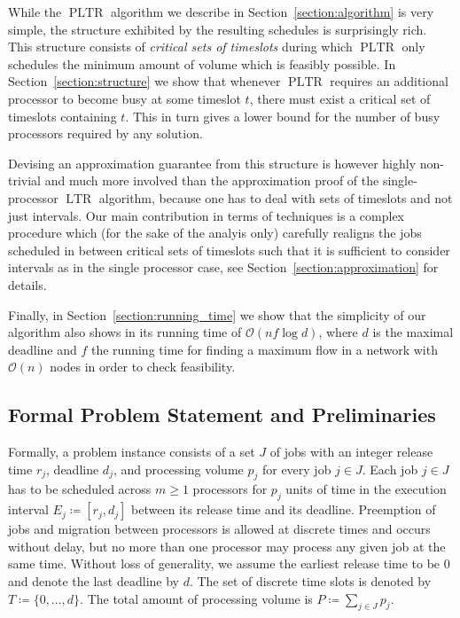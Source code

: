 \documentclass[a4paper]{article}
\DeclareMathOperator{\PLTR}{PLTR}
\DeclareMathOperator{\LTR}{LTR}
\begin{document}
While the $\PLTR$ algorithm we describe in Section~\ref{section:algorithm} is very simple, the structure exhibited by the resulting schedules is surprisingly rich.
This structure consists of \textit{critical sets of timeslots} during which $\PLTR$ only schedules the minimum amount of volume which is feasibly possible.
In Section~\ref{section:structure} we show that whenever $\PLTR$ requires an additional processor to become busy at some timeslot $t$, there must exist a critical set of timeslots containing $t$.
This in turn gives a lower bound for the number of busy processors required by any solution.

Devising an approximation guarantee from this structure is however highly non-trivial and much more involved than the approximation proof of the single-processor $\LTR$ algorithm, because one has to deal with sets of timeslots and not just intervals.
Our main contribution in terms of techniques is a complex procedure which (for the sake of the analyis only) carefully realigns the jobs scheduled in between critical sets of timeslots such that it is sufficient to consider intervals as in the single processor case, see Section~\ref{section:approximation} for details.

Finally, in Section~\ref{section:running_time} we show that the simplicity of our algorithm also shows in its running time of $\mathcal{O}(n f \log d)$, where $d$ is the maximal deadline and $f$ the running time for finding a maximum flow in a network with $\mathcal{O}(n)$ nodes in order to check feasibility.



\subsection{Formal Problem Statement and Preliminaries}
Formally, a problem instance consists of a set $J$ of jobs with an integer release time $r_j$, deadline $d_j$, and processing volume $p_j$ for every job $j \in J$.
Each job $j \in J$ has to be scheduled across $m \geq 1$ processors for $p_j$ units of time in the execution interval $E_j \coloneqq [r_j, d_j]$ between its release time and its deadline.
Preemption of jobs and migration between processors is allowed at discrete times and occurs without delay, but no more than one processor may process any given job at the same time.
Without loss of generality, we assume the earliest release time to be $0$ and denote the last deadline by $d$.
The set of discrete time slots is denoted by $T \coloneqq \{0, \ldots, d\}$.
The total amount of processing volume is $P \coloneqq \sum_{j \in J} p_j$.
\end{document}

